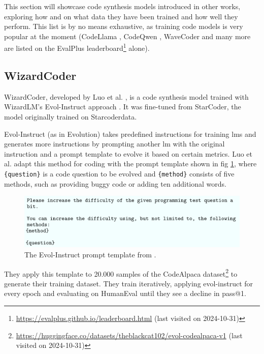 This section will showcase code synthesis models introduced in other works, exploring how and on what data they have been trained and how well they perform.
This list is by no means exhaustive, as training code models is very popular at the moment (CodeLlama \cite{Roziere.2023}, CodeQwen \cite{Bai.2023}, WaveCoder \cite{Yu.2024} and many more are listed on the EvalPlus leaderboard\footnote{\url{https://evalplus.github.io/leaderboard.html} (last visited on 2024-10-31)} alone).


\subsection{WizardCoder}
\label{sec:wizardcoder}
WizardCoder, developed by Luo et al. \cite{Luo.2024}, is a code synthesis model trained with WizardLM's Evol-Instruct approach \cite{Xu.2024}.
It was fine-tuned from StarCoder, the model originally trained on Starcoderdata.

Evol-Instruct (as in Evolution) takes predefined instructions for training \acp{lm} and generates more instructions by prompting another \ac{lm} with the original instruction and a prompt template to evolve it based on certain metrics.
Luo et al. adapt this method for coding with the prompt template shown in fig \ref{fig:evolinst}, where \texttt{\{question\}} is a code question to be evolved and \texttt{\{method\}} consists of five methods, such as providing buggy code or adding ten additional words.

\begin{figure}[!h]
    \centering
    \includegraphics[width=\textwidth]{bilder/kapitel3/evolinst.png}
    \caption{The Evol-Instruct prompt template from \cite{Luo.2024}.}
    \label{fig:evolinst}
\end{figure}

They apply this template to 20.000 samples of the CodeAlpaca dataset\footnote{\url{https://huggingface.co/datasets/theblackcat102/evol-codealpaca-v1} (last visited on 2024-10-31)} to generate their training dataset.
They train iteratively, applying evol-instruct for every epoch and evaluating on HumanEval until they see a decline in pass@1.


